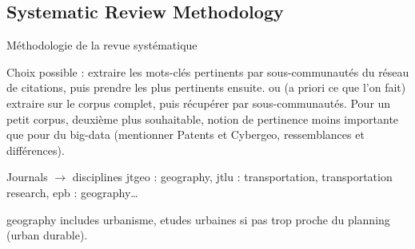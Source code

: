 \label{app:sec:modelography}





\subsection{Systematic Review Methodology}{Méthodologie de la revue systématique}


Choix possible : extraire les mots-clés pertinents par sous-communautés du réseau de citations, puis prendre les plus pertinents ensuite.
ou (a priori ce que l'on fait) extraire sur le corpus complet, puis récupérer par sous-communautés. Pour un petit corpus, deuxième plus souhaitable, notion de pertinence moins importante que pour du big-data (mentionner Patents et Cybergeo, ressemblances et différences).










Journals $\rightarrow$ disciplines
jtgeo : geography, jtlu : transportation, transportation research, epb : geography\ldots

geography includes urbanisme, etudes urbaines si pas trop proche du planning (urban durable).









